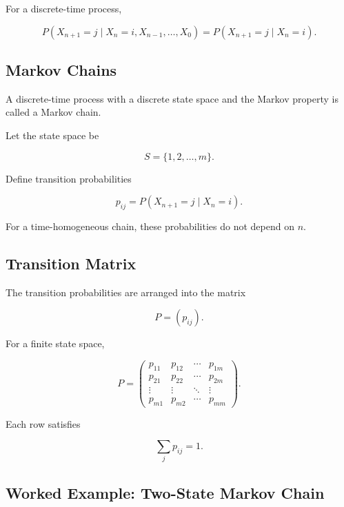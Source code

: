 For a discrete-time process,

\[
\boxed{
P
(
X_{n+1}=j
\mid
X_n=i,
X_{n-1},\ldots,X_0
)
=
P(X_{n+1}=j\mid X_n=i).
}
\]

\subsection{Markov Chains}
\label{subsec:markov-chains}

A discrete-time process with a discrete state space and the Markov
property is called a Markov chain.

Let the state space be

\[
S
=
\{1,2,\ldots,m\}.
\]

Define transition probabilities

\[
\boxed{
p_{ij}
=
P(X_{n+1}=j\mid X_n=i).
}
\]

For a time-homogeneous chain, these probabilities do not depend on
\(n\).

\subsection{Transition Matrix}
\label{subsec:transition-matrix}

The transition probabilities are arranged into the matrix

\[
\boxed{
P
=
(p_{ij}).
}
\]

For a finite state space,

\[
P
=
\begin{pmatrix}
p_{11}&p_{12}&\cdots&p_{1m}\\
p_{21}&p_{22}&\cdots&p_{2m}\\
\vdots&\vdots&\ddots&\vdots\\
p_{m1}&p_{m2}&\cdots&p_{mm}
\end{pmatrix}.
\]

Each row satisfies

\[
\boxed{
\sum_jp_{ij}=1.
}
\]

\subsection{Worked Example: Two-State Markov Chain}
\label{subsec:worked-two-state-markov}

